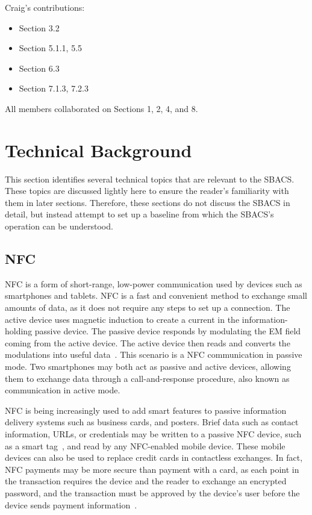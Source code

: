 \documentclass[12pt]{report}
\let\Oldsection\section
\renewcommand{\section}{\FloatBarrier\Oldsection}
\begin{document}
Craig's contributions:
\begin{itemize}
    \item Section 3.2
    \item Section 5.1.1, 5.5
    \item Section 6.3
    \item Section 7.1.3, 7.2.3
\end{itemize}

All members collaborated on Sections 1, 2, 4, and 8.


\chapter{Technical Background} \label{technical-background}

This section identifies several technical topics that are relevant to the SBACS. These topics are discussed lightly here
to ensure the reader's familiarity with them in later sections. Therefore, these sections do not discuss the SBACS in
detail, but instead attempt to set up a baseline from which the SBACS's operation can be understood.


\section{NFC} \label{nfc}

NFC is a form of short-range, low-power communication used by devices such as smartphones and tablets. NFC is a fast
and convenient method to exchange small amounts of data, as it does not require any steps to set up a connection. The 
active device uses magnetic induction to create a current in the information-holding passive device. The
passive device responds by modulating the EM field coming from the active device. The active device then reads and
converts the modulations into useful data~\autocite{NFCORG}. This scenario is a NFC communication in passive mode. Two
smartphones may both act as passive and active devices, allowing them to exchange data through a call-and-response procedure,
also known as communication in active mode.

NFC is being increasingly used to add smart features to passive information delivery systems such as business cards, and posters.
Brief data such as contact information, URLs, or credentials may be written to a passive NFC device, such as a smart
tag~\autocite{NFCFORUMWHATIS}, and read by any NFC-enabled mobile device. These mobile devices can also be used to
replace credit cards in contactless exchanges. In fact, NFC payments may be more secure than payment with a card, as
each point in the transaction requires the device and the reader to exchange an encrypted password, and the transaction
must be approved by the device's user before the device sends payment information~\autocite{NFCPAYMENT}.
\end{document}

